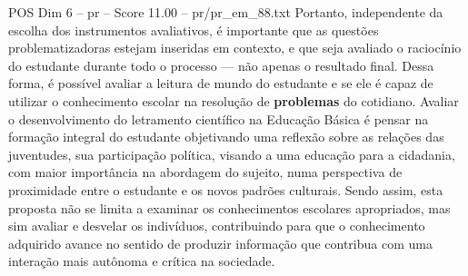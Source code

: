 \begin{textsample}{POS Dim 6 – pr – Score 11.00 – pr/pr\_em\_88.txt}
Portanto, independente da escolha dos instrumentos avaliativos, é importante que as questões problematizadoras estejam inseridas em contexto, e que seja avaliado o raciocínio do estudante durante todo o processo — não apenas o resultado final.
Dessa forma, é possível avaliar a leitura de mundo do estudante e se ele é capaz de utilizar o conhecimento escolar na resolução de \textbf{problemas} do cotidiano.
Avaliar o desenvolvimento do letramento científico na Educação Básica é pensar na formação integral do estudante objetivando uma reflexão sobre as relações das juventudes, sua participação política, visando a uma educação para a cidadania, com maior importância na abordagem do sujeito, numa perspectiva de proximidade entre o estudante e os novos padrões culturais.
Sendo assim, esta proposta não se limita a examinar os conhecimentos escolares apropriados, mas sim avaliar e desvelar os indivíduos, contribuindo para que o conhecimento adquirido avance no sentido de produzir informação que contribua com uma interação mais autônoma e crítica na sociedade.

\end{textsample}
